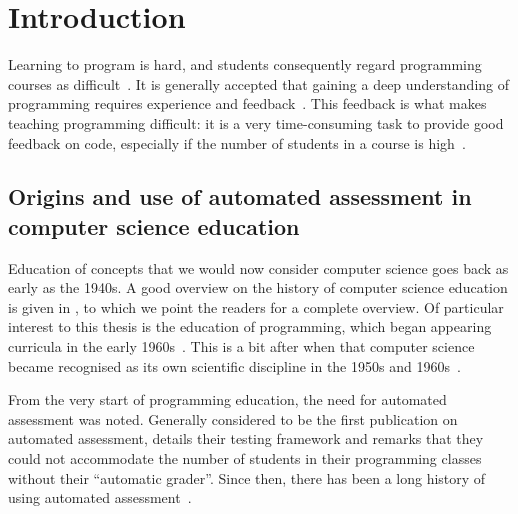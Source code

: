\documentclass[./main]{subfiles}
\begin{document}
\chapter{Introduction}\label{ch:introduction}

Learning to program is hard, and students consequently regard programming courses as difficult~\autocite{robinsLearningTeachingProgramming2003,simoesNatureProgrammingExercises2020}.
It is generally accepted that gaining a deep understanding of programming requires experience and feedback~\autocite{gomesEnvironmentImproveProgramming2007}.
This feedback is what makes teaching programming difficult: it is a very time-consuming task to provide good feedback on code, especially if the number of students in a course is high~\autocite{zavalaUseSemanticbasedAIG2018,staubitzRepositoryOpenAutogradable2017,queirosPexilProgrammingExercises2011,pirttinenCrowdsourcingProgrammingAssignments2018,gulwaniFeedbackGenerationPerformance2014,tangDatadrivenTestCase2016}.

\section{Origins and use of automated assessment in computer science education}\label{sec:automated-assessment-in-computer-science-education}

Education of concepts that we would now consider computer science goes back as early as the 1940s.
A good overview on the history of computer science education is given in \textcite{tedreChangingAimsComputing2018}, to which we point the readers for a complete overview.
Of particular interest to this thesis is the education of programming, which began appearing curricula in the early 1960s~\autocite{simonEmergenceComputingEducation2015}.
This is a bit after when that computer science became recognised as its own scientific discipline in the 1950s and 1960s~\autocite{hopcroftComputerScienceEmergence1987,atchisonComputerScienceNew1971,gornComputerInformationSciences1963,knuthComputerScienceIts1974,denningScienceComputerScience2013}.

From the very start of programming education, the need for automated assessment was noted.
Generally considered to be the first publication on automated assessment, \textcite{hollingsworthAutomaticGradersProgramming1960} details their testing framework and remarks that they could not accommodate the number of students in their programming classes without their ``automatic grader''.
Since then, there has been a long history of using automated assessment~\autocite{ala-mutkaSurveyAutomatedAssessment2005,douceAutomaticTestbasedAssessment2005,ihantolaReviewRecentSystems2010,paivaAutomatedAssessmentComputer2022,combefisAutomatedCodeAssessment2022,nayakAutomatedAssessmentTools2022,messerAutomatedGradingFeedback2024}.
\end{document}

